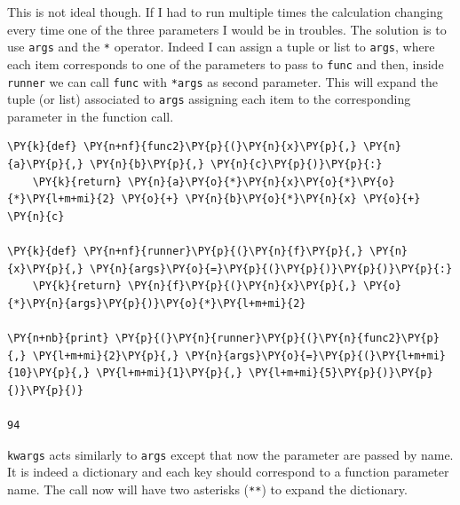 This is not ideal though. If I had to run multiple times the calculation changing every time one 
of the three parameters I would be in troubles. 
The solution is to use \texttt{args} and the \texttt{*} operator. Indeed I can assign a 
tuple or list to \texttt{args}, where each item corresponds to one of the parameters to 
pass to \texttt{func} and then, inside \texttt{runner} we can call \texttt{func} with \texttt{*args} 
as second parameter. This will expand the tuple (or list) associated to \texttt{args} 
assigning each item to the corresponding parameter in the function call.

\begin{codebox}
\begin{Verbatim}[commandchars=\\\{\}]
\PY{k}{def} \PY{n+nf}{func2}\PY{p}{(}\PY{n}{x}\PY{p}{,} \PY{n}{a}\PY{p}{,} \PY{n}{b}\PY{p}{,} \PY{n}{c}\PY{p}{)}\PY{p}{:}
    \PY{k}{return} \PY{n}{a}\PY{o}{*}\PY{n}{x}\PY{o}{*}\PY{o}{*}\PY{l+m+mi}{2} \PY{o}{+} \PY{n}{b}\PY{o}{*}\PY{n}{x} \PY{o}{+} \PY{n}{c}
 		
\PY{k}{def} \PY{n+nf}{runner}\PY{p}{(}\PY{n}{f}\PY{p}{,} \PY{n}{x}\PY{p}{,} \PY{n}{args}\PY{o}{=}\PY{p}{(}\PY{p}{)}\PY{p}{)}\PY{p}{:}
    \PY{k}{return} \PY{n}{f}\PY{p}{(}\PY{n}{x}\PY{p}{,} \PY{o}{*}\PY{n}{args}\PY{p}{)}\PY{o}{*}\PY{l+m+mi}{2}
 		
\PY{n+nb}{print} \PY{p}{(}\PY{n}{runner}\PY{p}{(}\PY{n}{func2}\PY{p}{,} \PY{l+m+mi}{2}\PY{p}{,} \PY{n}{args}\PY{o}{=}\PY{p}{(}\PY{l+m+mi}{10}\PY{p}{,} \PY{l+m+mi}{1}\PY{p}{,} \PY{l+m+mi}{5}\PY{p}{)}\PY{p}{)}\PY{p}{)}
 
94
\end{Verbatim}
\end{codebox}

\texttt{kwargs} acts similarly to \texttt{args} except that now the parameter are passed by 
name. It is indeed a dictionary and each key should correspond to a function parameter name. 
The call now will have two asterisks (\texttt{**}) to expand the dictionary.
 
